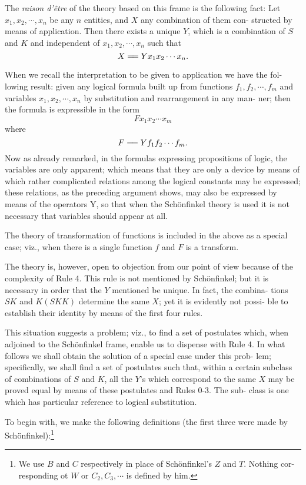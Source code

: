 \documentclass[9pt, twoside]{extarticle}
\newcommand{\td}[2][] {\todo[tickmarkheight=3pt, inline, size=\tiny, #1]{#2}}
\newcommand\longeq{=\joinrel=}
\begin{document}
The \textit{raison d'être} of the theory based on this frame is the following fact:
Let \(x_1, x_2,\cdots, x_n\) be any \(n\) entities, and \(X\) any combination of them con-
structed by means of application. Then there exists a unique \(Y\), which is a
combination of \(S\) and \(K\) and independent of \(x_1, x_2,\cdots, x_n\) such that
\[X \longeq Y x_1 x_2 \cdots x_n.\]

When we recall the interpretation to be given to application we have the fol-
lowing result: given any logical formula built up from functions \(f_1, f_2,\cdots, f_m\)
and variables \(x_1, x_2,\cdots, x_n\) by substitution and rearrangement in any man-
ner; then the formula is expressible in the form
\[Fx_1x_2\cdots x_m\]
where
\[F\longeq Yf_1f_2\cdots f_m.\]
\td{don't indent}
Now as already remarked, in the formulas expressing propositions of logic,
the variables are only apparent; which means that they are only a device by
means of which rather complicated relations among the logical constants
may be expressed; these relations, as the preceding argument shows, may also
be expressed by means of the operators Y, so that when the Schönfinkel theory
is used it is not necessary that variables should appear at all.

The theory of transformation of functions is included in the above as a
special case; viz., when there is a single function \(f\) and \(F\) is a transform.

The theory is, however, open to objection from our point of view because
of the complexity of Rule 4\td{link}. This rule is not mentioned by Schönfinkel; but
it is necessary in order that the \(Y\) mentioned be unique. In fact, the combina-
tions \(SK\) and \(K(SKK)\) determine the same \(X\); yet it is evidently not possi-
ble to establish their identity by means of the first four rules.

This situation suggests a problem; viz., to find a set of postulates which,
when adjoined to the Schönfinkel frame, enable us to dispense with Rule 4.
In what follows we shall obtain the solution of a special case under this prob-
lem; specifically, we shall find a set of postulates such that, within a certain
subclass of combinations of \(S\) and \(K\), all the \(Y\)'s which correspond
to the same \(X\) may be proved equal by means of these postulates and Rules 0-3. The sub-
class is one which has particular reference to logical substitution.

To begin with, we make the following definitions (the first three were made by Schönfinkel):\footnote{We use \(B\) and \(C\) respectively in place of Schönfinkel's \(Z\) and \(T\). Nothing cor- responding ot \(W\) or \(C_2, C_3, \cdots\) is defined by him.}
\end{document}
